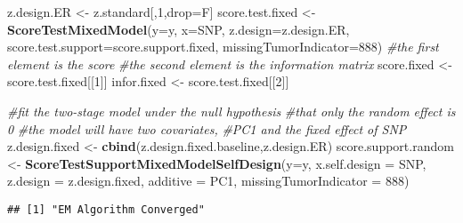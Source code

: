 \documentclass[11pt,]{article}
\newenvironment{Shaded}{\begin{snugshade}}{\end{snugshade}}
\newcommand{\KeywordTok}[1]{\textcolor[rgb]{0.13,0.29,0.53}{\textbf{#1}}}
\newcommand{\DataTypeTok}[1]{\textcolor[rgb]{0.13,0.29,0.53}{#1}}
\newcommand{\DecValTok}[1]{\textcolor[rgb]{0.00,0.00,0.81}{#1}}
\newcommand{\StringTok}[1]{\textcolor[rgb]{0.31,0.60,0.02}{#1}}
\newcommand{\CommentTok}[1]{\textcolor[rgb]{0.56,0.35,0.01}{\textit{#1}}}
\newcommand{\NormalTok}[1]{#1}
\begin{document}
\begin{Shaded}
\begin{Highlighting}[]
\NormalTok{z.design.ER <-}\StringTok{ }\NormalTok{z.standard[,}\DecValTok{1}\NormalTok{,drop=F]}
\NormalTok{score.test.fixed <-}\StringTok{ }\KeywordTok{ScoreTestMixedModel}\NormalTok{(}\DataTypeTok{y=}\NormalTok{y,}
                    \DataTypeTok{x=}\NormalTok{SNP,}
                    \DataTypeTok{z.design=}\NormalTok{z.design.ER,}
                    \DataTypeTok{score.test.support=}\NormalTok{score.support.fixed,}
                    \DataTypeTok{missingTumorIndicator=}\DecValTok{888}\NormalTok{)}
\CommentTok{#the first element is the score}
\CommentTok{#the second element is the information matrix}
\NormalTok{score.fixed <-}\StringTok{ }\NormalTok{score.test.fixed[[}\DecValTok{1}\NormalTok{]]}
\NormalTok{infor.fixed <-}\StringTok{ }\NormalTok{score.test.fixed[[}\DecValTok{2}\NormalTok{]]}

\CommentTok{#fit the two-stage model under the null hypothesis}
\CommentTok{#that only the random effect is 0}
\CommentTok{#the model will have two covariates, }
\CommentTok{#PC1 and the fixed effect of SNP}
\NormalTok{z.design.fixed <-}\StringTok{ }\KeywordTok{cbind}\NormalTok{(z.design.fixed.baseline,z.design.ER)}
\NormalTok{score.support.random <-}\StringTok{ }\KeywordTok{ScoreTestSupportMixedModelSelfDesign}\NormalTok{(}\DataTypeTok{y=}\NormalTok{y,}
                        \DataTypeTok{x.self.design  =}\NormalTok{ SNP,}
                        \DataTypeTok{z.design =}\NormalTok{ z.design.fixed,}
                        \DataTypeTok{additive =}\NormalTok{ PC1,}
                        \DataTypeTok{missingTumorIndicator =} \DecValTok{888}\NormalTok{)}
\end{Highlighting}
\end{Shaded}

\begin{verbatim}
## [1] "EM Algorithm Converged"
\end{verbatim}
\end{document}
